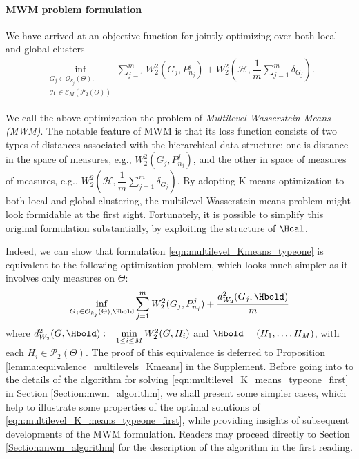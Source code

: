 \paragraph{MWM problem formulation} We have arrived at an objective function for jointly
optimizing over both local and global clusters
\vspace{-6pt}
\begin{eqnarray}
\mathop {\inf }\limits_{\substack {G_{j} \in \mathcal{O}_{k_{j}}(\Theta), \\\mathcal{H} \in 
\mathcal{E}_{M}(\mathcal{P}_{2}(\Theta))}}{\mathop {\sum }\limits_{j=1}^{m}{W_{2}
^{2}(G_{j},P_{n_{j}}^{j})}}
+ W_{2}^{2}(\mathcal{H},\dfrac{1}{m}\mathop {\sum }\limits_{j=1}^{m}{\delta_{G_{j}}}). \label{eqn:multilevel_Kmeans_typeone}
\end{eqnarray}

We call the above optimization the problem of \emph{Multilevel Wasserstein Means (MWM)}. 
The notable feature of MWM is that its loss function consists of two types of distances 
associated with the hierarchical data structure:
one is distance in the space of measures, e.g., $W_{2}^{2}(G_{j},P_{n_{j}}^{j})$, 
and the other in space of measures of measures, e.g., 
$W_{2}^{2}(\mathcal{H},\dfrac{1}{m}\mathop {\sum }\limits_{j=1}^{m}{\delta_{G_{j}}})$. By 
adopting K-means optimization to both local and global clustering, the multilevel Wasserstein means 
problem might look formidable at the first sight. 
Fortunately, it is possible to simplify this original formulation substantially,
by exploiting the structure of $\Hcal$.

Indeed, we can show that formulation \eqref{eqn:multilevel_Kmeans_typeone} is
equivalent to the following optimization problem, which looks much simpler as
it involves only measures on $\Theta$:
\begin{eqnarray}
\mathop {\inf }\limits_{G_{j} \in \mathcal{O}_{k_{j}}(\Theta), \Hbold}
{\mathop {\sum }\limits_{j=1}^{m}{W_{2}^{2}(G_{j},P_{n_{j}}^{j})}+\dfrac{d_{W_{2}}^{2}(G_{j},\Hbold)}{m}} \label{eqn:multilevel_K_means_typeone_first}
\end{eqnarray}
where $d_{W_{2}}^{2}(G,\Hbold) := \mathop {\min } \limits_{1 \leq i \leq M}{W_{2}^{2}(G,H_{i})}$ and $\Hbold=(H_{1},\ldots,H_{M})$,
with each $H_i \in \mathcal{P}_2(\Theta)$. The proof of this 
equivalence is deferred to Proposition \ref{lemma:equivalence_multilevels_Kmeans} in the Supplement. 
Before going into to the details of the algorithm for solving 
\eqref{eqn:multilevel_K_means_typeone_first}
in Section \ref{Section:mwm_algorithm}, we shall present some simpler cases,
which help to illustrate some properties of the optimal solutions of 
\eqref{eqn:multilevel_K_means_typeone_first},
while providing insights of subsequent developments of the MWM formulation.
Readers may proceed directly to Section \ref{Section:mwm_algorithm} 
for the description of the algorithm in the first reading.
%
%
%
%
